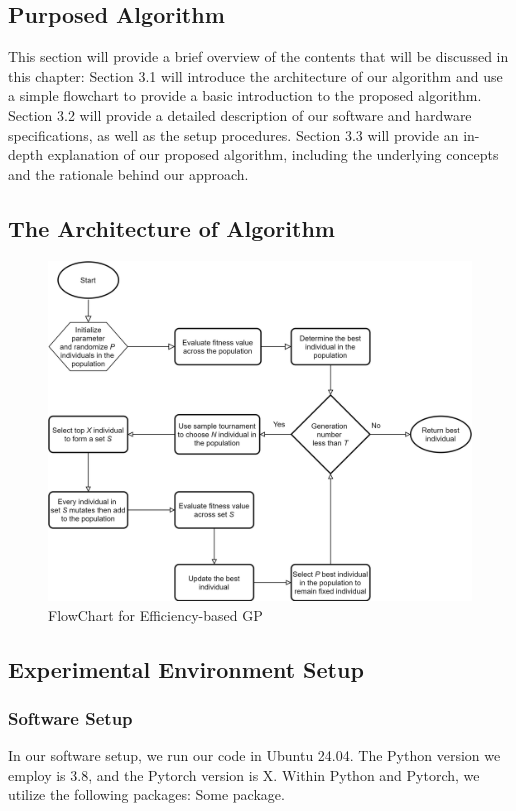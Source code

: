 \begin{ZhChapter}

\chapter{Purposed Algorithm}
This section will provide a brief overview of the contents that will be discussed in this chapter: Section 3.1 will introduce the architecture of our algorithm and use a simple flowchart to provide a basic introduction to the proposed algorithm. Section 3.2 will provide a detailed description of our software and hardware specifications, as well as the setup procedures. Section 3.3 will provide an in-depth explanation of our proposed algorithm, including the underlying concepts and the rationale behind our approach.
\section{The Architecture of Algorithm} %
    \begin{figure}[htbp]
    \centering
    \includegraphics[width = 1\textwidth]{image/FlowChart.png}
    \caption{FlowChart for Efficiency-based GP}
    \label{fig: image}
    \end{figure}
\section{Experimental Environment Setup}

\subsection{Software Setup}
In our software setup, we run our code in Ubuntu 24.04. The Python version we employ is 3.8, and the Pytorch version is X. Within Python and Pytorch, we utilize the following packages: Some package.


\end{ZhChapter}
